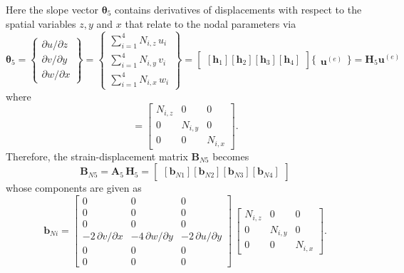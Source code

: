 Here the slope vector $\boldsymbol{\theta}_5$ contains derivatives of displacements with respect to the spatial variables $z, y$ and $x$ that relate to the nodal parameters via
\begin{equation}
	\boldsymbol{\theta}_5 =  \begin{Bmatrix}
		\partial u / \partial z\\
		\partial v / \partial y \\
		\partial w / \partial x
	\end{Bmatrix}
	= \begin{Bmatrix}
		\sum\nolimits_{i=1}^4 N_{i,z} \, u_i\\
		\sum\nolimits_{i=1}^4 N_{i,y} \, v_i \\
		\sum\nolimits_{i=1}^4 N_{i,x} \, w_i
	\end{Bmatrix} 
	= \begin{bmatrix}
		[\mathbf{h}_1] [\mathbf{h}_2] [\mathbf{h}_3] [\mathbf{h}_4] 
	\end{bmatrix} \bigl\{ \begin{matrix} \mathbf{u}^{(e)} \end{matrix} \bigr\}
	= \mathbf{H}_5  \mathbf{u}^{(e)}
\end{equation}
where 
\begin{equation}
	[\mathbf{h}_i] = \begin{bmatrix}
		N_{i,z} &  0 & 0  \\
		0 & N_{i,y} & 0  \\
		0 & 0 & N_{i,x} \end{bmatrix}. 
\end{equation}
Therefore, the strain-displacement matrix $\mathbf{B}_{N5}$ becomes
\begin{equation}
	\mathbf{B}_{N5} = \mathbf{A}_5 \, \mathbf{H}_5 = \begin{bmatrix}
		[\mathbf{b}_{N1}] [\mathbf{b}_{N2}] [\mathbf{b}_{N3}] [\mathbf{b}_{N4}]
	\end{bmatrix} 
\end{equation}
whose components are given as
\begin{equation}
	\mathbf{b}_{Ni} = \begin{bmatrix}
		0 & 0 &  0   \\
		0 &  0 & 0  \\
		0 &  0 & 0 \\
		- 2 \, \partial v / \partial x & - 4 \, \partial w / \partial y & - 2 \, \partial u / \partial y  \\
		0 &  0 & 0  \\
		0 &  0 & 0  \end{bmatrix} \, \begin{bmatrix}
		N_{i,z} &  0 & 0  \\
		0 & N_{i,y} & 0  \\
		0 & 0 & N_{i,x}  \end{bmatrix}.
\end{equation}

